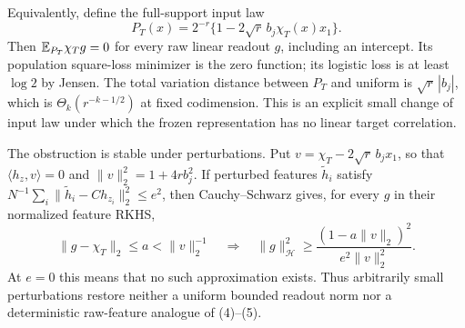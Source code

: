 Equivalently, define the full-support input law
\[
 P_T(x)=2^{-r}\{1-2\sqrt r\,b_j\chi_T(x)x_1\}.
\]
Then $\mathbb E_{P_T}\chi_Tg=0$ for every raw linear readout $g$, including
an intercept. Its population square-loss minimizer is the zero function;
its logistic loss is at least $\log2$ by Jensen. The total variation
distance between $P_T$ and uniform is $\sqrt r\,|b_j|$, which is
$\Theta_k(r^{-k-1/2})$ at fixed codimension. This is an explicit small
change of input law under which the frozen representation has no linear
target correlation.

The obstruction is stable under perturbations. Put
$v=\chi_T-2\sqrt r\,b_jx_1$, so that
$\langle h_z,v\rangle=0$ and $\|v\|_2^2=1+4r b_j^2$.
If perturbed features $\widetilde h_i$ satisfy
$N^{-1}\sum_i\|\widetilde h_i-C h_{z_i}\|_2^2\le e^2$, then
Cauchy--Schwarz gives, for every $g$ in their normalized feature RKHS,
\[
 \|g-\chi_T\|_2\le a<\|v\|_2^{-1}
 \quad\Longrightarrow\quad
 \|g\|_{\mathcal H}^2\ge
        \frac{(1-a\|v\|_2)^2}{e^2\|v\|_2^2}.           \tag{26}
\]
At $e=0$ this means that no such approximation exists.
Thus arbitrarily small perturbations restore neither a uniform bounded
readout norm nor a deterministic raw-feature analogue of (4)--(5).
